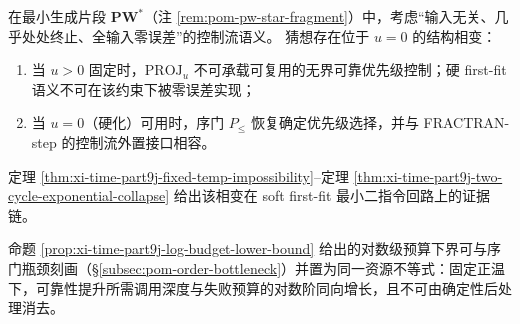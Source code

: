 \begin{conjecture}[正温软序门的零误差语义相变]\label{conj:xi-time-part9j-soft-order-phase-transition}
在最小生成片段 \(\mathbf{PW}^{\ast}\)（注 \ref{rem:pom-pw-star-fragment}）中，考虑“输入无关、几乎处处终止、全输入零误差”的控制流语义。
猜想存在位于 \(u=0\) 的结构相变：
\begin{enumerate}
  \item 当 \(u>0\) 固定时，\(\mathrm{PROJ}_u\) 不可承载可复用的无界可靠优先级控制；硬 first-fit 语义不可在该约束下被零误差实现；
  \item 当 \(u=0\)（硬化）可用时，序门 \(P_{\le}\) 恢复确定优先级选择，并与 FRACTRAN-step 的控制流外置接口相容。
\end{enumerate}
定理 \ref{thm:xi-time-part9j-fixed-temp-impossibility}--定理 \ref{thm:xi-time-part9j-two-cycle-exponential-collapse} 给出该相变在 soft first-fit 最小二指令回路上的证据链。
\end{conjecture}

\begin{remark}[门深预算与温度障碍的同阶化接口]\label{rem:xi-time-part9j-log-budget-gate-depth}
命题 \ref{prop:xi-time-part9j-log-budget-lower-bound} 给出的对数级预算下界可与序门瓶颈刻画（\S\ref{subsec:pom-order-bottleneck}）并置为同一资源不等式：固定正温下，可靠性提升所需调用深度与失败预算的对数阶同向增长，且不可由确定性后处理消去。
\end{remark}
